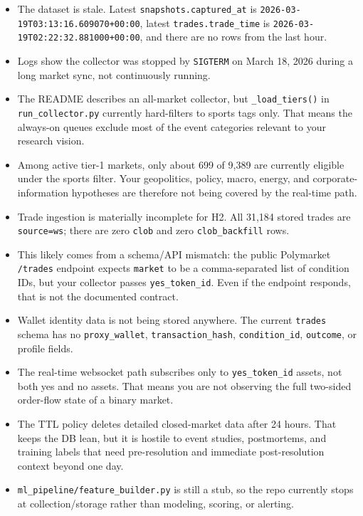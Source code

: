 \documentclass[
]{article}
\providecommand{\tightlist}{%
  \setlength{\itemsep}{0pt}\setlength{\parskip}{0pt}}
\begin{document}
\begin{itemize}
\tightlist
\item
  The dataset is stale. Latest \texttt{snapshots.captured\_at} is
  \texttt{2026-03-19T03:13:16.609070+00:00}, latest
  \texttt{trades.trade\_time} is
  \texttt{2026-03-19T02:22:32.881000+00:00}, and there are no rows from
  the last hour.
\item
  Logs show the collector was stopped by \texttt{SIGTERM} on March 18,
  2026 during a long market sync, not continuously running.
\item
  The README describes an all-market collector, but
  \texttt{\_load\_tiers()} in \texttt{run\_collector.py} currently
  hard-filters to sports tags only. That means the always-on queues
  exclude most of the event categories relevant to your research vision.
\item
  Among active tier-1 markets, only about 699 of 9,389 are currently
  eligible under the sports filter. Your geopolitics, policy, macro,
  energy, and corporate-information hypotheses are therefore not being
  covered by the real-time path.
\item
  Trade ingestion is materially incomplete for H2. All 31,184 stored
  trades are \texttt{source=\textquotesingle{}ws\textquotesingle{}};
  there are zero \texttt{clob} and zero \texttt{clob\_backfill} rows.
\item
  This likely comes from a schema/API mismatch: the public Polymarket
  \texttt{/trades} endpoint expects \texttt{market} to be a
  comma-separated list of condition IDs, but your collector passes
  \texttt{yes\_token\_id}. Even if the endpoint responds, that is not
  the documented contract.
\item
  Wallet identity data is not being stored anywhere. The current
  \texttt{trades} schema has no \texttt{proxy\_wallet},
  \texttt{transaction\_hash}, \texttt{condition\_id}, \texttt{outcome},
  or profile fields.
\item
  The real-time websocket path subscribes only to
  \texttt{yes\_token\_id} assets, not both yes and no assets. That means
  you are not observing the full two-sided order-flow state of a binary
  market.
\item
  The TTL policy deletes detailed closed-market data after 24 hours.
  That keeps the DB lean, but it is hostile to event studies,
  postmortems, and training labels that need pre-resolution and
  immediate post-resolution context beyond one day.
\item
  \texttt{ml\_pipeline/feature\_builder.py} is still a stub, so the repo
  currently stops at collection/storage rather than modeling, scoring,
  or alerting.
\end{itemize}
\end{document}
